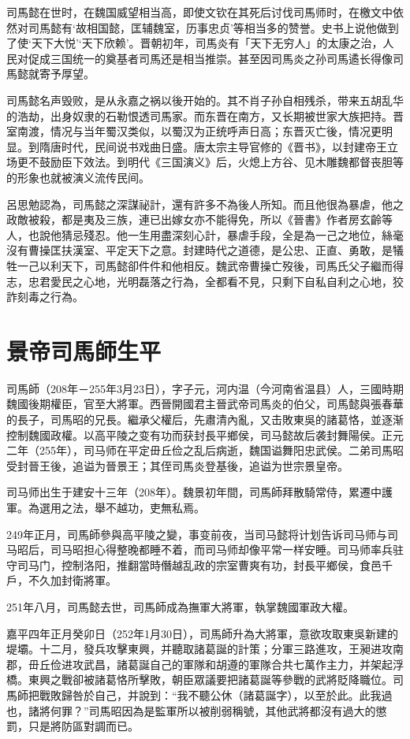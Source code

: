 司馬懿在世时，在魏国威望相当高，即使文钦在其死后讨伐司馬师时，在檄文中依然对司馬懿有‘故相国懿，匡辅魏室，历事忠贞’等相当多的赞誉。史书上说他做到了使‘天下大悦’‘天下欣赖’。晋朝初年，司馬炎有「天下无穷人」的太康之治，人民对促成三国统一的奠基者司馬还是相当推崇。甚至因司馬炎之孙司馬遹长得像司馬懿就寄予厚望。

司馬懿名声毁败，是从永嘉之祸以後开始的。其不肖子孙自相残杀，带来五胡乱华的浩劫，出身奴隶的石勒恨透司馬家。而东晋在南方，又长期被世家大族把持。晋室南渡，情况与当年蜀汉类似，以蜀汉为正统呼声日高；东晋灭亡後，情况更明显。到隋唐时代，民间说书戏曲日盛。唐太宗主导官修的《晋书》，以封建帝王立场更不鼓励臣下效法。到明代《三国演义》后，火熄上方谷、见木雕魏都督丧胆等的形象也就被演义流传民间。

呂思勉認為，司馬懿之深謀祕計，還有許多不為後人所知。而且他很為暴虐，他之政敵被殺，都是夷及三族，連已出嫁女亦不能得免，所以《晉書》作者房玄齡等人，也說他猜忌殘忍。他一生用盡深刻心計，暴虐手段，全是為一己之地位，絲毫沒有曹操匡扶漢室、平定天下之意。封建時代之道德，是公忠、正直、勇敢，是犠牲一己以利天下，司馬懿卻件件和他相反。魏武帝曹操亡歿後，司馬氏父子繼而得志，忠君愛民之心地，光明磊落之行為，全都看不見，只剩下自私自利之心地，狡詐刻毒之行為。

\section{景帝司馬師生平}

司馬師（208年－255年3月23日），字子元，河内温（今河南省温县）人，三國時期魏國後期權臣，官至大將軍。西晉開國君主晉武帝司馬炎的伯父，司馬懿與張春華的長子，司馬昭的兄長。繼承父權后，先肅清內亂，又击敗東吳的諸葛恪，並逐渐控制魏國政權。以高平陵之变有功而获封長平鄉侯，司马懿故后袭封舞陽侯。正元二年（255年），司马师在平定毌丘俭之乱后病逝，魏国谥舞阳忠武侯。二弟司馬昭受封晉王後，追谥为晉景王；其侄司馬炎登基後，追谥为世宗景皇帝。

司马师出生于建安十三年（208年）。魏景初年間，司馬師拜散騎常侍，累遷中護軍。為選用之法，舉不越功，吏無私焉。

249年正月，司馬師參與高平陵之變，事变前夜，当司马懿将计划告诉司马师与司马昭后，司马昭担心得整晚都睡不着，而司马师却像平常一样安睡。司马师率兵驻守司马门，控制洛阳，推翻當時僭越乱政的宗室曹爽有功，封長平鄉侯，食邑千戶，不久加封衛將軍。

251年八月，司馬懿去世，司馬師成為撫軍大將軍，執掌魏國軍政大權。

嘉平四年正月癸卯日（252年1月30日），司馬師升為大將軍，意欲攻取東吳新建的堤壩。十二月，發兵攻擊東興，并聽取諸葛誕的計策；分軍三路進攻，王昶进攻南郡，毌丘俭进攻武昌，諸葛誕自己的軍隊和胡遵的軍隊合共七萬作主力，并架起浮橋。東興之戰卻被諸葛恪所擊敗，朝臣眾議要把諸葛誕等參戰的武將貶降職位。司馬師把戰敗歸咎於自己，并說到：“我不聽公休（諸葛誕字），以至於此。此我過也，諸將何罪？”司馬昭因為是監軍所以被削弱稱號，其他武將都沒有過大的懲罰，只是將防區對調而已。

